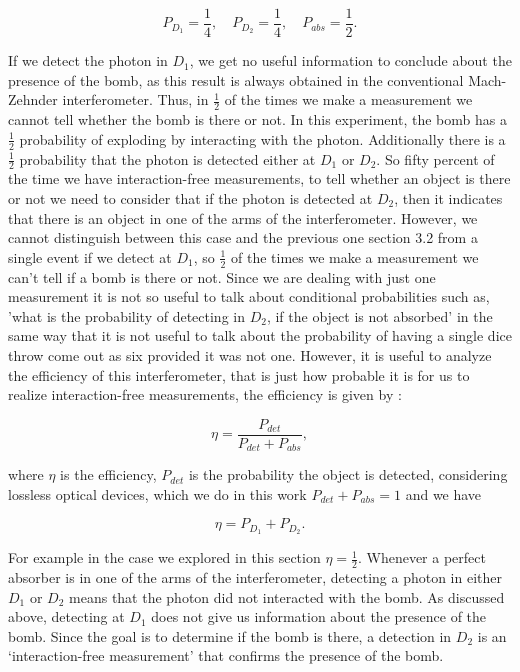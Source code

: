 \documentclass[12pt]{book}
\begin{document}
\begin{equation}
P_{D_{1}}=\frac{1}{4},\quad P_{D_{2}}=\frac{1}{4}, \quad P_{abs}=\frac{1}{2}.
\end{equation}



If we detect the photon in $D_{1}$, we get no useful information to conclude about the presence of the bomb, as this result is always obtained in the conventional Mach-Zehnder interferometer. Thus, in $\frac{1}{2}$ of the times we make a measurement we cannot tell whether the bomb is there or not. In this experiment, the bomb has a $\frac{1}{2}$ probability of exploding by interacting with the photon. Additionally there is a $\frac{1}{2}$ probability that the photon is detected either at $D_{1}$ or $D_{2}$. So fifty percent of the time we have interaction-free measurements, to tell whether an object is there or not we need to consider that if the photon is detected at $D_{2}$, then it indicates that there is an object in one of the arms of the interferometer. However, we cannot distinguish between this case and the previous one section 3.2 from a single event if we detect at $D_{1}$, so $\frac{1}{2}$ of the times we make a measurement we can't tell if a bomb is there or not. Since we are dealing with just one measurement it is not so useful to talk about conditional probabilities such as, 'what is the probability of detecting in $D_{2}$, if the object is not absorbed' in the same way that it is not useful to talk about the probability of having a single dice throw come out as six provided it was not one. However, it is useful to analyze the efficiency of this interferometer, that is just how probable it is for us to realize interaction-free measurements, the efficiency is given by \cite{5}:

\begin{equation}
\eta=\frac{P_{det}}{P_{det}+P_{abs}},
\end{equation}

where $\eta$ is the efficiency, $P_{det}$ is the probability the object is detected, considering lossless optical devices, which we do in this work $P_{det}+P_{abs}=1$ and we have

\begin{equation}
\eta=P_{D_{1}}+P_{D_{2}}.
\end{equation}

For example in the case we explored in this section $\eta=\frac{1}{2}$.  Whenever a perfect absorber is in one of the arms of the interferometer, detecting a photon in either $D_1$ or $D_2$ means that the photon did not interacted with the bomb. As discussed above, detecting at $D_1$ does not give us information about the presence of the bomb. Since the goal is to determine if the bomb is there, a detection in $D_2$ is an ‘interaction-free measurement’ that confirms the presence of the bomb.
  
\end{document}
